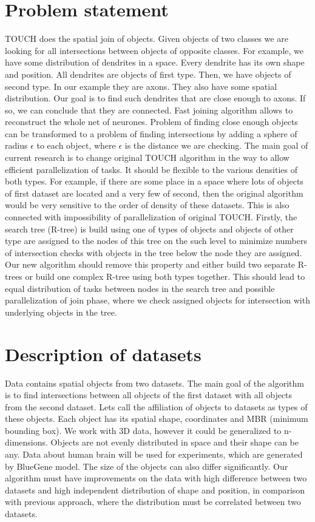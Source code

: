\documentclass{sig-alternate}
\begin{document}
\section{Problem statement}
TOUCH does the spatial join of objects. Given objects of two classes we are looking for all intersections between objects of opposite classes. For example, we have some distribution of dendrites in a space. Every dendrite has its own shape and position. All dendrites are objects of first type. Then, we have objects of second type. In our example they are axons. They also have some spatial distribution. Our goal is to find such dendrites that are close enough to axons. If so, we can conclude that they are connected. Fast joining algorithm allows to reconstruct the whole net of neurones. Problem of finding close enough objects can be transformed to a problem of finding intersections by adding a sphere of radius $\epsilon$ to each object, where $\epsilon$ is the distance we are checking. The main goal of current research is to change original TOUCH algorithm in the way to allow efficient parallelization of tasks. It should be flexible to the various densities of both types. For example, if there are some place in a space where lots of objects of first dataset are located and a very few of second, then the original algorithm would be very sensitive to the order of density of these datasets. This is also connected with impossibility of parallelization of original TOUCH. Firstly, the search tree (R-tree) is build using one of types of objects and objects of other type are assigned to the nodes of this tree on the such level to minimize numbers of intersection checks with objects in the tree below the node they are assigned. Our new algorithm should remove this property and either build two separate R-trees or build one complex R-tree using both types together. This should lead to equal distribution of tasks between nodes in the search tree and possible parallelization of join phase, where we check assigned objects for intersection with underlying objects in the tree. 

\section{Description of datasets}
Data contains spatial objects from two datasets. The main goal of the algorithm is to find intersections between all objects of the first dataset with all objects from the second dataset. Lets call the affiliation of objects to datasets as types of these objects. Each object has its spatial shape, coordinates and MBR (minimum bounding box). We work with 3D data, however it could be generalized to n-dimensions. Objects are not evenly distributed in space and their shape can be any. Data about human brain will be used for experiments, which are generated by BlueGene model. The size of the objects can also differ significantly. Our algorithm must have improvements on the data with high difference between two datasets and high independent distribution of shape and position, in comparison with previous approach, where the distribution must be correlated between two datasets.
\end{document}
